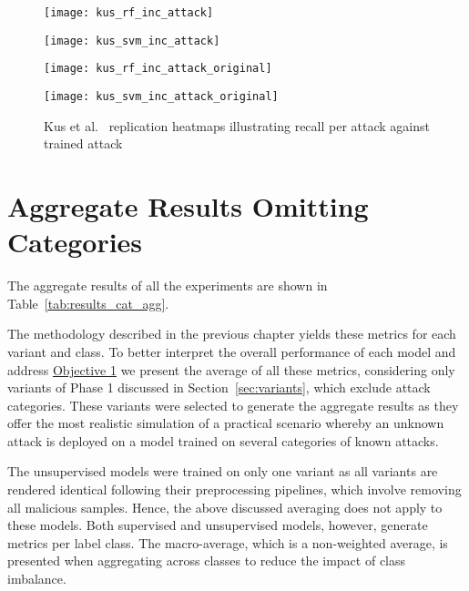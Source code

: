 \begin{figure}[htbp]
    \centering
    \begin{minipage}[h]{0.5\textwidth}
        \centering
        \texttt{[image: kus\_rf\_inc\_attack]}
    \end{minipage}\hfill
    \begin{minipage}[h]{0.5\textwidth}
        \centering
        \texttt{[image: kus\_svm\_inc\_attack]}
    \end{minipage}
    \begin{minipage}[h]{0.5\textwidth}
        \centering
        \texttt{[image: kus\_rf\_inc\_attack\_original]}
    \end{minipage}\hfill
    \begin{minipage}[h]{0.5\textwidth}
        \centering
        \texttt{[image: kus\_svm\_inc\_attack\_original]}
    \end{minipage}
    \caption[Kus et al.~\cite{Kus} Replication Single Attack Heatmaps]{Kus et al.~\cite{Kus} replication heatmaps illustrating recall per attack against trained attack\label{fig:kus_rep_inc_att}}
\end{figure}
% 

\section{Aggregate Results Omitting Categories}%
\label{sec:agg_res_cat}

The aggregate results of all the experiments are shown in
Table~\ref{tab:results_cat_agg}.

The methodology described in the previous chapter yields these metrics for each
variant and class. To better interpret the overall performance of each model
and address \hyperlink{obj}{Objective 1} we present the average of all these
metrics, considering only variants of Phase 1 discussed in
Section~\ref{sec:variants}, which exclude attack categories. These variants
were selected to generate the aggregate results as they offer the most
realistic simulation of a practical scenario whereby an unknown attack is
deployed on a model trained on several categories of known attacks.

The unsupervised models were trained on only one variant as all variants are
rendered identical following their preprocessing pipelines, which involve
removing all malicious samples. Hence, the above discussed averaging does not
apply to these models. Both supervised and unsupervised models, however,
generate metrics per label class. The macro-average, which is a non-weighted
average, is presented when aggregating across classes to reduce the impact of
class imbalance.

